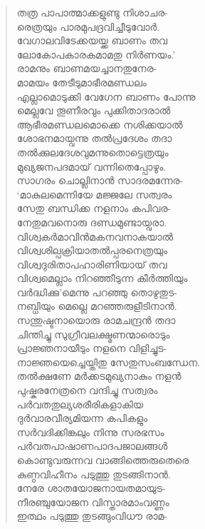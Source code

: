 \begin{verse}
തത്ര പാപാത്മാക്കളുണ്ടു നിശാചര-\\
രെത്രയും പാരമുപദ്രവിച്ചീടുവോര്‍.\\
വേഗാലവിടേക്കയയ്ക്ക ബാണം തവ\\
ലോകോപകാരകമാമതു നിര്‍ണയം.’\\
രാമനും ബാണമയച്ചാനതുനേര-\\
മാമയം തേടീടുമാഭീരമണ്ഡലം\\
എല്ലാമൊടുക്കി വേഗേന ബാണം പോന്നു\\
മെല്ലവേ തൂണീരവും പുക്കിതാദരാല്‍\\
ആഭീരമണ്ഡലമൊക്കെ നശിക്കയാല്‍\\
ശോഭനമായ്വന്നു തല്‍പ്രദേശം തദാ\\
തല്‍ക്കുലദേശവുമന്നുതൊട്ടെത്രയും\\
മുഖ്യജനപദമായ് വന്നിതെപ്പോഴും.\\
സാഗരം ചൊല്ലിനാന്‍ സാദരമന്നേര-\\
‘മാകുലമെന്നിയേ മജ്ജലേ സത്വരം\\
സേതു ബന്ധിക്ക നളനാം കപിവര-\\
നേതുമവനൊരു ദണ്ഡമുണ്ടായ്വരാ.\\
വിശ്വകര്‍മാവിന്‍മകനവനാകയാല്‍\\
വിശ്വശില്പക്രിയാതല്‍പ്പരനെത്രയും\\
വിശ്വദുരിതാപഹാരിണിയായ് തവ\\
വിശ്വമെല്ലാം നിറഞ്ഞീടുന്ന കീര്‍ത്തിയും\\
വര്‍ദ്ധിക്കു’മെന്നു പറഞ്ഞു തൊഴുതുട-\\
നബ്ധിയും മെല്ലെ മറഞ്ഞരുളീടിനാന്‍.\\
സന്തുഷ്ടനായൊരു രാമചന്ദ്രന്‍ തദാ\\
ചിന്തിച്ചു സുഗ്രീവലക്ഷ്മണന്മാരൊടും\\
പ്രാജ്ഞനായീടും നളനെ വിളിച്ചുട-\\
നാജ്ഞയെച്ചെയ്തിതു സേതുസംബന്ധേന.\\
തല്‍ക്ഷണേ മര്‍ക്കടമുഖ്യനാകും നളന്‍\\
പുഷ്കരനേത്രനെ വന്ദിച്ചു സത്വരം\\
പര്‍വതതുല്യശരീരികളാകിയ\\
ദുര്‍വാരവീര്യമിയന്ന കപികളും\\
സര്‍വദിക്കിങ്കലും നിന്നു സരഭസം\\
പര്‍വതപാഷാണപാദപജാലങ്ങള്‍\\
കൊണ്ടുവരുന്നവ വാങ്ങിത്തെരുതെരെ\\
കുണ്ഠവിഹീനം പടുത്തു തുടങ്ങിനാന്‍.\\
നേരേ ശാതയോജനായതമായുട-\\
നീരഞ്ചുയോജന വിസ്താരമാംവണ്ണം\\
ഇത്ഥം പടുത്തു തുടങ്ങുംവിധൗ രാമ-\\

\end{verse}
